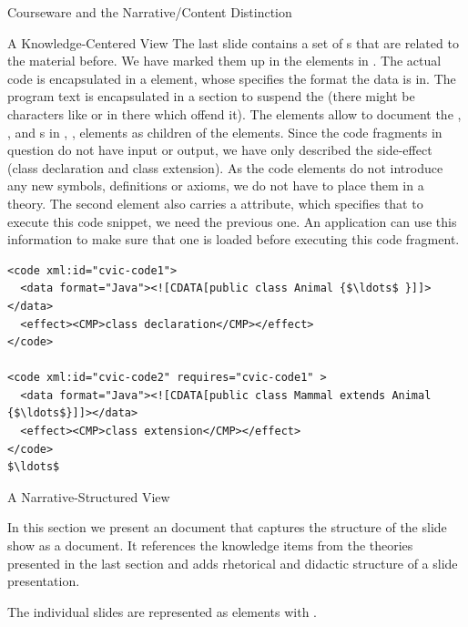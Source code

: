 \begin{tchapter}[id=courseware]{Courseware and the Narrative/Content Distinction}
\begin{tsection}[id=knowledge-centered]{A Knowledge-Centered View}
The last slide contains a set of {} {s} that are
related to the material before.  We have marked them up in the {} elements
in {}. The actual code is encapsulated in a {} element,
whose {} specifies the format the data is in. The program text is
encapsulated in a {} section to suspend the {\xml} {}
(there might be characters like {\snippet{<}} or {\snippet{\&}} in there which offend it).
The {} elements allow to document the {},
{}, and {s} in {},
{}, {} elements as children of the {}
elements. Since the code fragments in question do not have input or output, we have only
described the side-effect (class declaration and class extension). As the code elements do
not introduce any new symbols, definitions or axioms, we do not have to place them in a
theory. The second {} element also carries a {}
attribute, which specifies that to execute this code snippet, we need the previous one. An
application can use this information to make sure that one is loaded before executing this
code fragment.

\begin{lstlisting}[label=lst:cvi-code,mathescape,
    caption={{\omdoc} Representation of Program Code},
    index={code,data,CDATA,effect}]
<code xml:id="cvic-code1">
  <data format="Java"><![CDATA[public class Animal {$\ldots$ }]]></data>
  <effect><CMP>class declaration</CMP></effect>
</code>

<code xml:id="cvic-code2" requires="cvic-code1" >
  <data format="Java"><![CDATA[public class Mammal extends Animal {$\ldots$}]]></data>
  <effect><CMP>class extension</CMP></effect>
</code>
$\ldots$
\end{lstlisting}
\end{tsection}

\begin{tsection}[id=narrative-structured]{A Narrative-Structured View}

In this section we present an {\omdoc} document that captures the structure of the
slide show as a document. It references the knowledge items from the theories
presented in the last section and adds rhetorical and didactic structure of a
slide presentation.

The individual slides are represented as {} elements with
{} {}.


\end{tsection}
\end{tchapter}
